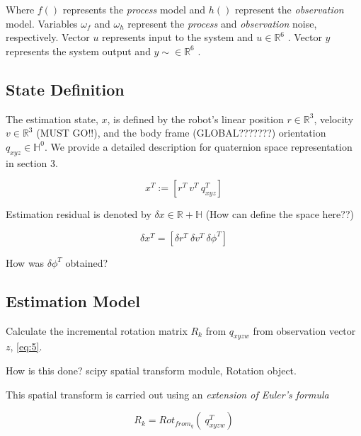 \documentclass[letterpaper, 10 pt, conference]{ieeeconf}  %
\newcommand{\transpose}[1]{\ensuremath{#1^{\scriptscriptstyle T}}}
\begin{document}
Where $f()$ represents the \textit{process} model and $h()$ represent the
\textit{observation} model.
Variables $\omega_{f}$ and $\omega_{h}$ represent the \textit{process} and \textit{observation} noise, respectively.
Vector $u$ represents input to the system and $u \in \mathbb{R}^{6}$ .
Vector $y$ represents the system output and $y \sim \in \mathbb{R}^6$ .


\subsection{State Definition}

The estimation state, $x$, is defined by the robot's linear position $r \in \mathbb{R}^3$, velocity
$v \in \mathbb{R}^3$ (MUST GO!!), and the body frame (GLOBAL???????) orientation $q_{xyz} \in \mathbb{H}^0$. We provide a detailed description for quaternion space representation in section 3.

\begin{equation}
\label{eq:8}
\transpose{x} :=  \left[\transpose{r}~\transpose{v}~\transpose{q_{xyz}} \right]
\end{equation}


Estimation residual is denoted by $\delta x \in \mathbb{R + H}$  (How can define the space here??)


\begin{equation}
\label{eq:10}
\delta \transpose{x} = \left[\transpose{\delta r} ~\transpose{\delta v} ~\transpose{\delta \phi} \right]
\end{equation}

How was $ \transpose{\delta \phi} $ obtained?


\subsection{Estimation Model}

Calculate the incremental rotation matrix $R_k$ from $q_{xyzw}$ from observation
vector $z$, \ref{eq:5}.

How is this done? scipy spatial transform module, Rotation object.

This spatial transform is carried out using an \textit{extension of Euler's formula}

\begin{equation}
\label{eq:11}
R_{k} = Rot_{from_q} \left( ~\transpose{q_{xyzw} } \right)
\end{equation}
\end{document}
